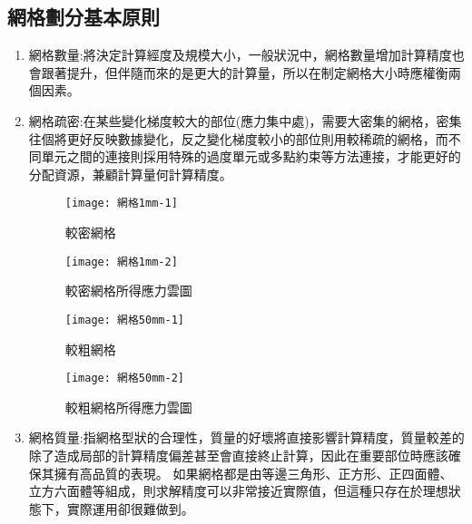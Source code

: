 \subsection{網格劃分基本原則}
\begin{enumerate}
\item 網格數量:將決定計算經度及規模大小，一般狀況中，網格數量增加計算精度也會跟著提升，但伴隨而來的是更大的計算量，所以在制定網格大小時應權衡兩個因素。
\item 網格疏密:在某些變化梯度較大的部位(應力集中處)，需要大密集的網格，密集往個將更好反映數據變化，反之變化梯度較小的部位則用較稀疏的網格，而不同單元之間的連接則採用特殊的過度單元或多點約束等方法連接，才能更好的分配資源，兼顧計算量何計算精度。

\begin{figure}[htbp]
  \begin{center}
    \begin{minipage}[H]{0.4\linewidth}
      \centering
      \texttt{[image: 網格1mm-1]}
      \caption{\Large 較密網格}
      \label{網格1mm-1}
    \end{minipage}
    \hfill
    \begin{minipage}[H]{0.4\linewidth}
      \centering
      \texttt{[image: 網格1mm-2]}
      \caption{\Large 較密網格所得應力雲圖}
      \label{網格1mm-2}
    \end{minipage}
  \end{center}
\end{figure}


\begin{figure}[htbp]
  \begin{center}
    \begin{minipage}[t]{0.4\linewidth}
      \centering
      \texttt{[image: 網格50mm-1]}
      \caption{\Large 較粗網格}
      \label{網格50mm-1}
    \end{minipage}
    \hfill
    \begin{minipage}[t]{0.4\linewidth}
      \centering
      \texttt{[image: 網格50mm-2]}
      \caption{\Large 較粗網格所得應力雲圖}
      \label{網格50mm-2}
    \end{minipage}
  \end{center}
\end{figure}

\item 網格質量:指網格型狀的合理性，質量的好壞將直接影響計算精度，質量較差的除了造成局部的計算精度偏差甚至會直接終止計算，因此在重要部位時應該確保其擁有高品質的表現。
如果網格都是由等邊三角形、正方形、正四面體、立方六面體等組成，則求解精度可以非常接近實際值，但這種只存在於理想狀態下，實際運用卻很難做到。
\end{enumerate}
\newpage


